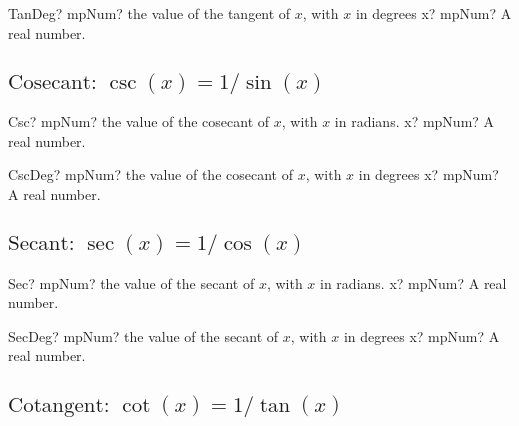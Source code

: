 \vspace{0.6cm}

\begin{mpFunctionsExtract}
	\mpFunctionOne
	{TanDeg? mpNum? the value of the tangent of $x$, with $x$ in degrees}
	{x? mpNum? A real number.}
\end{mpFunctionsExtract}






\subsection{\texorpdfstring{$\text{Cosecant: }\csc(x) = 1/\sin(x)$}{csc}}

\begin{mpFunctionsExtract}
	\mpFunctionOne
	{Csc? mpNum? the value of the cosecant of $x$, with $x$ in radians.}
	{x? mpNum? A real number.}
\end{mpFunctionsExtract}

\vspace{0.6cm}

\begin{mpFunctionsExtract}
	\mpFunctionOne
	{CscDeg? mpNum? the value of the cosecant of $x$, with $x$ in degrees}
	{x? mpNum? A real number.}
\end{mpFunctionsExtract}





\subsection{\texorpdfstring{$\text{Secant: }\sec(x) = 1/\cos(x)$}{sec}}

\begin{mpFunctionsExtract}
	\mpFunctionOne
	{Sec? mpNum? the value of the secant of $x$, with $x$ in radians.}
	{x? mpNum? A real number.}
\end{mpFunctionsExtract}

\vspace{0.6cm}

\begin{mpFunctionsExtract}
	\mpFunctionOne
	{SecDeg? mpNum? the value of the secant of $x$, with $x$ in degrees}
	{x? mpNum? A real number.}
\end{mpFunctionsExtract}






\subsection{\texorpdfstring{$\text{Cotangent: }\cot(x) = 1/\tan(x)$}{cot}}

